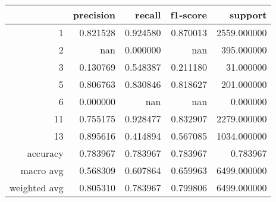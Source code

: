 \begin{tabular}{rrrrr}
\toprule
 & precision & recall & f1-score & support \\
\midrule
1 & 0.821528 & 0.924580 & 0.870013 & 2559.000000 \\
2 & nan & 0.000000 & nan & 395.000000 \\
3 & 0.130769 & 0.548387 & 0.211180 & 31.000000 \\
5 & 0.806763 & 0.830846 & 0.818627 & 201.000000 \\
6 & 0.000000 & nan & nan & 0.000000 \\
11 & 0.755175 & 0.928477 & 0.832907 & 2279.000000 \\
13 & 0.895616 & 0.414894 & 0.567085 & 1034.000000 \\
accuracy & 0.783967 & 0.783967 & 0.783967 & 0.783967 \\
macro avg & 0.568309 & 0.607864 & 0.659963 & 6499.000000 \\
weighted avg & 0.805310 & 0.783967 & 0.799806 & 6499.000000 \\
\bottomrule
\end{tabular}
